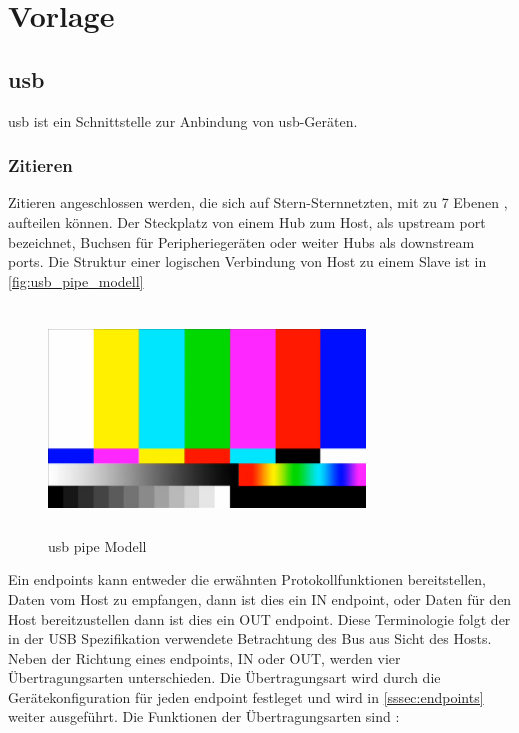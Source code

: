 \section{Vorlage}
\subsection[USB]{\acrshort{usb}}
\acrfull{usb} ist ein Schnittstelle zur Anbindung von \acrshort{usb}-Geräten.


\subsubsection{Zitieren} \label{sssec:zitieren}

Zitieren \cite[s. 31]{usb_developer_guide} angeschlossen werden, die sich auf Stern-Sternnetzten, mit zu 7 Ebenen \cite[4.1.1]{usb_developer_guide}, aufteilen können. Der Steckplatz von einem Hub zum Host, als upstream port bezeichnet, Buchsen für Peripheriegeräten oder weiter Hubs als downstream ports.
Die Struktur einer logischen Verbindung von Host zu einem Slave ist in \autoref{fig:usb_pipe_modell} 
\begin{figure}[h]
    \centering
    \includegraphics[width=0.75\textwidth,height=6cm,keepaspectratio=true]{content/images/Cypress_ubs_figure_1.PNG}
    \caption{\acrshort{usb} pipe Modell \cite[Figure~1]{usb_developer_guide}}
    \label{fig:usb_pipe_modell}
\end{figure}
\par
Ein endpoints kann entweder die erwähnten Protokollfunktionen bereitstellen, Daten vom Host zu empfangen, dann ist dies ein IN endpoint, oder Daten für den Host bereitzustellen dann ist dies ein OUT endpoint. Diese Terminologie folgt der in der USB Spezifikation verwendete Betrachtung des Bus aus Sicht des Hosts.
Neben der Richtung eines endpoints, IN oder OUT, werden vier Übertragungsarten \cite[5.4]{usb_developer_guide} unterschieden. Die Übertragungsart wird durch die Gerätekonfiguration für jeden endpoint festleget und wird in \autoref{sssec:endpoints} weiter ausgeführt. Die Funktionen der Übertragungsarten sind \cite[4.7]{usb_developer_guide}:

